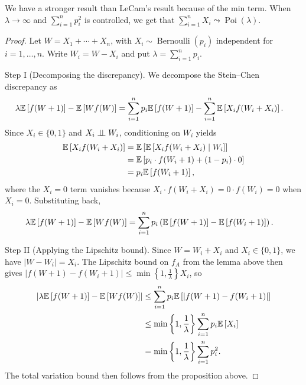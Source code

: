 We have a stronger result than LeCam's result because of the min term. When $\lambda\to \infty$ and $\sum_{i=1}^{n} p_i^2$ is controlled, we get that $\sum_{i=1}^{n}X_i \leadsto \operatorname{Poi}(\lambda)$.
\begin{proof}
	Let $W = X_1 + \cdots + X_n$, with $X_i \sim \operatorname{Bernoulli}(p_i)$ independent for $i = 1, \ldots, n$. Write $W_i = W - X_i$ and put $\lambda = \sum_{i=1}^{n} p_i$.

	Step I (Decomposing the discrepancy). We decompose the Stein--Chen discrepancy as
	\begin{align*}
		\lambda \mathbb{E}\left[f(W+1)\right] - \mathbb{E}\left[Wf(W)\right]
		&= \sum\limits_{i=1}^{n} p_i \mathbb{E}\left[f(W+1)\right] - \sum\limits_{i=1}^{n} \mathbb{E}\left[X_i f(W_i + X_i)\right]
	.\end{align*}
	Since $X_i \in \{0,1\}$ and $X_i \perp\!\!\!\perp W_i$, conditioning on $W_i$ yields
	\begin{align*}
		\mathbb{E}\left[X_i f(W_i + X_i)\right]
		&= \mathbb{E}\left[\mathbb{E}\left[X_i f(W_i + X_i) \mid W_i\right]\right] \\
		&= \mathbb{E}\left[p_i \cdot f(W_i + 1) + (1-p_i) \cdot 0\right] \\
		&= p_i \mathbb{E}\left[f(W_i + 1)\right]
	,\end{align*}
	where the $X_i = 0$ term vanishes because $X_i \cdot f(W_i + X_i) = 0 \cdot f(W_i) = 0$ when $X_i = 0$. Substituting back,
	\begin{align*}
		\lambda \mathbb{E}\left[f(W+1)\right] - \mathbb{E}\left[Wf(W)\right]
		&= \sum\limits_{i=1}^{n} p_i \left(\mathbb{E}\left[f(W+1)\right] - \mathbb{E}\left[f(W_i+1)\right]\right)
	.\end{align*}

	Step II (Applying the Lipschitz bound). Since $W = W_i + X_i$ and $X_i \in \{0,1\}$, we have $|W - W_i| = X_i$. The Lipschitz bound on $f_A$ from the lemma above then gives $\left|f(W+1) - f(W_i+1)\right| \le \min\left\{1,\frac{1}{\lambda}\right\} X_i$, so
	\begin{align*}
		\left|\lambda \mathbb{E}\left[f(W+1)\right] - \mathbb{E}\left[Wf(W)\right]\right|
		&\le \sum\limits_{i=1}^{n} p_i \mathbb{E}\left[\left|f(W+1) - f(W_i+1)\right|\right] \\
		&\le \min\left\{1,\frac{1}{\lambda}\right\} \sum\limits_{i=1}^{n} p_i \mathbb{E}\left[X_i\right] \\
		&= \min\left\{1,\frac{1}{\lambda}\right\} \sum\limits_{i=1}^{n} p_i^2
	.\end{align*}
	The total variation bound then follows from the proposition above.
\end{proof}

